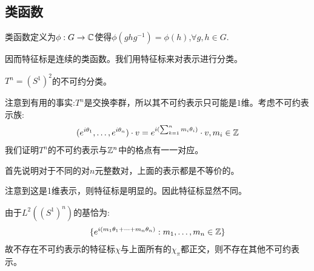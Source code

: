 \subsection*{类函数}
\begin{definition}
    类函数定义为$\phi: G \to \mathbb{C}$使得$\phi(ghg^{-1})=\phi(h)$,$\forall g,h \in G$.
\end{definition}
因而特征标是连续的类函数。我们用特征标来对表示进行分类。
\begin{example}[$T^n=(S^1)^n$]
    $T^n=(S^1)^2$的不可约分类。

    注意到有用的事实:$T^n$是交换李群，所以其不可约表示只可能是$1$维。考虑不可约表示族:
    \begin{align*}
        (e^{i\theta_1},\dots,e^{i\theta_n})\cdot v=e^{i(\sum_{k=1}^n m_i\theta_i)}\cdot v,m_i \in \mathbb{Z}
    \end{align*}
    我们证明$T^n$的不可约表示与$\mathbb{Z}^n$中的格点有一一对应。

    首先说明对于不同的对$n$元整数对，上面的表示都是不等价的。

    注意到这是1维表示，则特征标是明显的。因此特征标显然不同。

    由于$L^2((S^1)^n)$的基恰为:
    \begin{align*}
        \{e^{i(m_1\theta_1+\dots+m_n\theta_n)}:m_1,\dots,m_n \in \mathbb{Z}\}
    \end{align*}
   故不存在不可约表示的特征标$\chi$与上面所有的$\chi_{\pi}$都正交，则不存在其他不可约表示。
\end{example}
